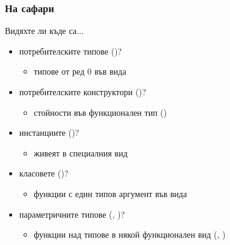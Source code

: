 \documentclass[alsotrans]{beamerswitch}
\begin{document}
\begin{frame}
  \frametitle{На сафари}
  \small
  Видяхте ли къде са...\pause
  \begin{itemize}[<+->]
  \item потребителските типове ()?
    \begin{itemize}
    \item типове от ред 0 във вида \lst{*}
    \end{itemize}
  \item потребителските конструктори ()?
    \begin{itemize}
    \item стойности във функционален тип ()
    \end{itemize}
  \item инстанциите ()?
    \begin{itemize}
    \item живеят в специалния вид 
    \end{itemize}
  \item класовете ()?
    \begin{itemize}
    \item функции с един типов аргумент във вида 
    \end{itemize}
  \item параметричните типове (, )?
    \begin{itemize}
    \item функции над типове в някой функционален вид (\lst{* -> *}, \lst{* -> * -> *})
    \end{itemize}
  \end{itemize}
\end{frame}
\end{document}
